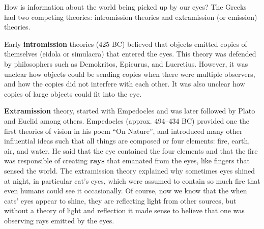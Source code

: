 How is information about the world being picked up by our eyes?
The Greeks had two competing theories: intromission theories and extramission (or emission) theories.


Early {\bf intromission} 
theories (425 BC) believed that objects emitted copies of themselves (eidola or simulacra) that entered the eyes. This theory was defended by philosophers such as Demokritos, Epicurus, and Lucretius. However, it was unclear how objects could be sending copies when there were multiple observers, and how the copies did not interfere with each other. It was also unclear how copies of large objects could fit into the eye. 

{\bf Extramission} theory, started with Empedocles \cite{kalderon2015form} and was later followed by Plato and Euclid among others. Empedocles (approx. 494--434 BC) provided one the first theories of vision in his poem ``On Nature'', and introduced many other influential ideas such that all things are composed or four elements: fire, earth, air, and water. He said that the eye contained the four elements and that the fire was responsible of creating {\bf rays} that emanated from the eyes, like fingers that sensed the world. The extramission theory explained why sometimes eyes shined at night, in particular cat's eyes, which were assumed to contain so much fire that even humans could see it occasionally. Of course, now we know that the when cats' eyes appear to shine, they
are reflecting light from other sources, but without a theory of light and reflection it made sense to believe that one was observing rays emitted by the eyes. 

